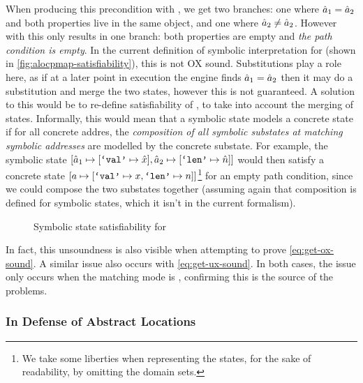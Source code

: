 When producing this precondition with \PMap, we get two branches: one where $\hat{a}_1=\hat{a}_2$ and both properties live in the same object, and one where $\hat{a}_2\neq \hat{a}_2$. However with \ALocPMap{} this only results in one branch: both properties are empty and \emph{the path condition is empty}. In the current definition of symbolic interpretation for \ALocPMap{} (shown in \autoref{fig:alocpmap-satisfiability}), this is not OX sound. Substitutions play a role here, as if at a later point in execution the engine finds $\hat{a}_1=\hat{a}_2$ then it may do a substitution and merge the two states, however this is not guaranteed. A solution to this would be to re-define satisfiability of \ALocPMap{}, to take into account the merging of states. Informally, this would mean that a symbolic state models a concrete state if for all concrete addres, the \emph{composition of all symbolic substates at matching symbolic addresses} are modelled by the concrete substate. For example, the symbolic state $[\hat{a}_1 \mapsto [\texttt{`val'} \mapsto \hat{x}], \hat{a}_2 \mapsto [\texttt{`len'}\mapsto \hat{n}]]$ would then satisfy a concrete state $[ a \mapsto [\texttt{`val'} \mapsto x, \texttt{`len'}\mapsto n]]$\footnote{We take some liberties when representing the states, for the sake of readability, by omitting the domain sets.} for an empty path condition, since we could compose the two substates together (assuming again that composition is defined for symbolic states, which it isn't in the current formalism).

\begin{figure}
	\centering
	\begin{mathpar}
	\end{mathpar}
\caption{Symbolic state satisfiability for \ALocPMap}
\label{fig:alocpmap-satisfiability}
\end{figure}

In fact, this unsoundness is also visible when attempting to prove \ref{eq:get-ox-sound}. A similar issue also occurs with \ref{eq:get-ux-sound}. In both cases, the issue only occurs when the matching mode is , confirming this is the source of the problems.

\subsubsection{In Defense of Abstract Locations}

